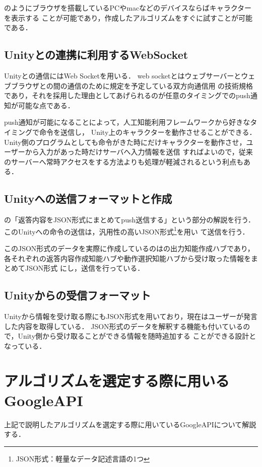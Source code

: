 
のようにブラウザを搭載しているPCやmacなどのデバイスならばキャラクターを表示する
ことが可能であり，作成したアルゴリズムをすぐに試すことが可能である．

\subsection{Unityとの連携に利用するWebSocket}
Unityとの通信にはWeb Socketを用いる．
web socketとはウェブサーバーとウェブブラウザとの間の通信のために規定を予定している双方向通信用
の技術規格であり，それを採用した理由としてあげられるのが任意のタイミングでのpush通知が可能な点である．

push通知が可能になることによって，人工知能利用フレームワークから好きなタイミングで命令を送信し，
Unity上のキャラクターを動作させることができる．
Unity側のプログラムとしても命令がきた時にだけキャラクターを動作させ，ユーザーから入力があった時だけサーバへ入力情報を送信
すればよいので，従来のサーバーへ常時アクセスをする方法よりも処理が軽減されるという利点もある．

\subsection{Unityへの送信フォーマットと作成}
の「返答内容をJSON形式にまとめてpush送信する」という部分の解説を行う．
このUnityへの命令の送信は，汎用性の高いJSON形式\footnote{JSON形式：軽量なデータ記述言語の1つ}を用い
て送信を行う．

このJSON形式のデータを実際に作成しているのはの出力知能作成ハブであり，
各それぞれの返答内容作成知能ハブや動作選択知能ハブから受け取った情報をまとめてJSON形式
にし，送信を行っている．

\subsection{Unityからの受信フォーマット}
Unityから情報を受け取る際にもJSON形式を用いており，現在はユーザーが発言した内容を取得している．
JSON形式のデータを解釈する機能も付いているので，Unity側から受け取ることができる情報を随時追加する
ことができる設計となっている．
\newpage
\section{アルゴリズムを選定する際に用いるGoogleAPI}
上記で説明したアルゴリズムを選定する際に用いているGoogleAPIについて解説する．


